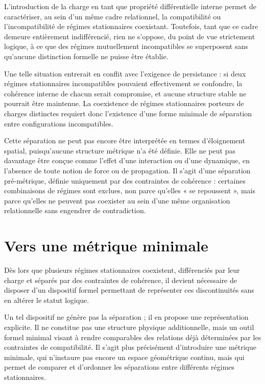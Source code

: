 \documentclass[11pt,a4paper]{article}
\begin{document}
L’introduction de la charge en tant que propriété différentielle interne permet de caractériser, au sein d’un même cadre relationnel, la compatibilité ou l’incompatibilité de régimes stationnaires coexistant. Toutefois, tant que ce cadre demeure entièrement indifférencié, rien ne s’oppose, du point de vue strictement logique, à ce que des régimes mutuellement incompatibles se superposent sans qu’aucune distinction formelle ne puisse être établie.

Une telle situation entrerait en conflit avec l’exigence de persistance : si deux régimes stationnaires incompatibles pouvaient effectivement se confondre, la cohérence interne de chacun serait compromise, et aucune structure stable ne pourrait être maintenue. La coexistence de régimes stationnaires porteurs de charges distinctes requiert donc l’existence d’une forme minimale de séparation entre configurations incompatibles.

Cette séparation ne peut pas encore être interprétée en termes d’éloignement spatial, puisqu’aucune structure métrique n’a été définie. Elle ne peut pas davantage être conçue comme l’effet d’une interaction ou d’une dynamique, en l’absence de toute notion de force ou de propagation. Il s’agit d’une séparation pré-métrique, définie uniquement par des contraintes de cohérence : certaines combinaisons de régimes sont exclues, non parce qu’elles « se repoussent », mais parce qu’elles ne peuvent pas coexister au sein d’une même organisation relationnelle sans engendrer de contradiction.

\section{Vers une métrique minimale}

Dès lors que plusieurs régimes stationnaires coexistent, différenciés par leur charge et séparés par des contraintes de cohérence, il devient nécessaire de disposer d’un dispositif formel permettant de représenter ces discontinuités sans en altérer le statut logique.

Un tel dispositif ne génère pas la séparation ; il en propose une représentation explicite. Il ne constitue pas une structure physique additionnelle, mais un outil formel minimal visant à rendre comparables des relations déjà déterminées par les contraintes de compatibilité. Il s’agit plus précisément d’introduire une métrique minimale, qui n’instaure pas encore un espace géométrique continu, mais qui permet de comparer et d’ordonner les séparations entre différents régimes stationnaires.
\end{document}
